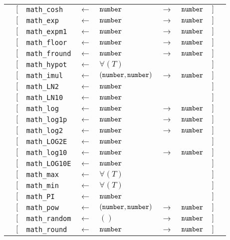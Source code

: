 \begin{tabular}[fragile]{lllllllll}
& $[$ & \texttt{math\_cosh} & $\leftarrow$  & $\texttt{number}$ & $\rightarrow$ & $\texttt{number}$ & $]$ \\
& $[$ & \texttt{math\_exp} & $\leftarrow$  & $\texttt{number}$ & $\rightarrow$ & $\texttt{number}$ & $]$ \\
& $[$ & \texttt{math\_expm1} & $\leftarrow$  & $\texttt{number}$ & $\rightarrow$ & $\texttt{number}$ & $]$ \\
& $[$ & \texttt{math\_floor} & $\leftarrow$  & $\texttt{number}$ & $\rightarrow$ & $\texttt{number}$ & $]$ \\
& $[$ & \texttt{math\_fround} & $\leftarrow$  & $\texttt{number}$ & $\rightarrow$ & $\texttt{number}$ & $]$ \\
& $[$ & \texttt{math\_hypot} & $\leftarrow$  & $\forall(T)$ & & & $]$ \\
& $[$ & \texttt{math\_imul} & $\leftarrow$  & $(\texttt{number}, \texttt{number})$ & $\rightarrow$ & $\texttt{number}$ & $]$ \\
& $[$ & \texttt{math\_LN2} & $\leftarrow$  & $\texttt{number}$ & & & $]$ \\
& $[$ & \texttt{math\_LN10} & $\leftarrow$  & $\texttt{number}$ & & & $]$ \\
& $[$ & \texttt{math\_log} & $\leftarrow$  & $\texttt{number}$ & $\rightarrow$ & $\texttt{number}$ & $]$ \\
& $[$ & \texttt{math\_log1p} & $\leftarrow$  & $\texttt{number}$ & $\rightarrow$ & $\texttt{number}$ & $]$ \\
& $[$ & \texttt{math\_log2} & $\leftarrow$  & $\texttt{number}$ & $\rightarrow$ & $\texttt{number}$ & $]$ \\
& $[$ & \texttt{math\_LOG2E} & $\leftarrow$  & $\texttt{number}$ & & & $]$ \\
& $[$ & \texttt{math\_log10} & $\leftarrow$  & $\texttt{number}$ & $\rightarrow$ & $\texttt{number}$ & $]$ \\
& $[$ & \texttt{math\_LOG10E} & $\leftarrow$  & $\texttt{number}$ & & & $]$ \\
& $[$ & \texttt{math\_max} & $\leftarrow$  & $\forall(T)$ & & & $]$ \\
& $[$ & \texttt{math\_min} & $\leftarrow$  & $\forall(T)$ & & & $]$ \\
& $[$ & \texttt{math\_PI} & $\leftarrow$  & $\texttt{number}$ & & & $]$ \\
& $[$ & \texttt{math\_pow} & $\leftarrow$  & $(\texttt{number}, \texttt{number})$ & $\rightarrow$ & $\texttt{number}$ & $]$ \\
& $[$ & \texttt{math\_random} & $\leftarrow$  & $()$ & $\rightarrow$ & $\texttt{number}$ & $]$ \\
& $[$ & \texttt{math\_round} & $\leftarrow$  & $\texttt{number}$ & $\rightarrow$ & $\texttt{number}$ & $]$ \\

\end{tabular}
